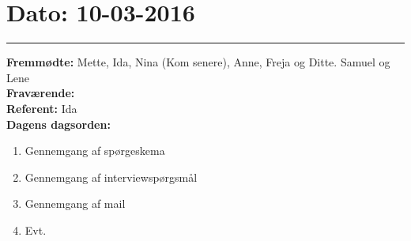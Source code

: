 \section{Dato: 10-03-2016}
\hrule
\textbf{Fremmødte: } Mette, Ida, Nina (Kom senere), Anne, Freja og Ditte. Samuel og Lene \\
\textbf{Fraværende: } \\
\textbf{Referent: } Ida \\
\textbf{Dagens dagsorden: }
\begin{enumerate}
	\item Gennemgang af spørgeskema
	\item Gennemgang af interviewspørgsmål
	\item Gennemgang af mail
	\item Evt. 
\end{enumerate}

